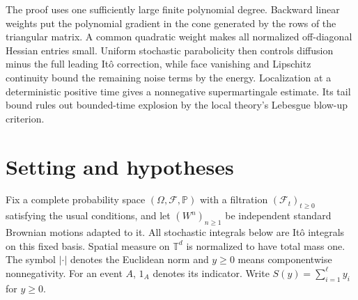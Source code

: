 \documentclass[11pt]{amsart}
\theoremstyle{definition}
\newcommand{\T}{\mathbb T}
\newcommand{\PP}{\mathbb P}
\newcommand{\F}{\mathcal F}
\newcommand{\ind}{1}
\numberwithin{equation}{section}
\begin{document}
The proof uses one sufficiently large finite polynomial degree. Backward
linear weights put the polynomial gradient in the cone generated by the
rows of the triangular matrix. A common quadratic weight makes all
normalized off-diagonal Hessian entries small. Uniform stochastic
parabolicity then controls diffusion minus the full leading It\^o
correction, while face vanishing and Lipschitz continuity bound the
remaining noise terms by the energy. Localization at a deterministic
positive time gives a nonnegative supermartingale estimate. Its tail
bound rules out bounded-time explosion by the local theory's Lebesgue
blow-up criterion.

\section{Setting and hypotheses}\label{sec:setting}

Fix a complete probability space $(\Omega,\F,\PP)$ with a filtration
$(\F_t)_{t\geq0}$ satisfying the usual conditions, and let $(W^n)_{n\geq1}$
be independent standard Brownian motions adapted to it. All stochastic
integrals below are It\^o integrals on this fixed basis. Spatial measure
on $\T^d$ is normalized to have total mass one. The symbol $|\cdot|$
denotes the Euclidean norm and $y\geq0$ means componentwise
nonnegativity. For an event $A$, $\ind_A$ denotes its indicator.
Write $S(y)=\sum_{i=1}^\ell y_i$ for $y\geq0$.
\end{document}
